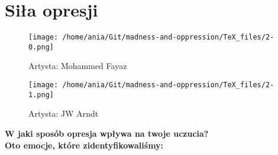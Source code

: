 \chapter{Siła opresji}
\begin{figure}[h]
\centering
\texttt{[image: /home/ania/Git/madness-and-oppression/TeX\_files/2-0.png]}
\caption{Artysta: Mohammed Fayaz}
\label{2-0}
\end{figure}


\newpage
\begin{figure}[h]
\centering
\texttt{[image: /home/ania/Git/madness-and-oppression/TeX\_files/2-1.png]}
\caption{Artysta: JW Arndt}
\label{2-1}
\end{figure}

\noindent\textcolor{ProcessBlue}{\textbf{\Large{W jaki sposób opresja wpływa na twoje uczucia?}}}\\
\large{\textbf{Oto emocje, które zidentyfikowaliśmy:}}
